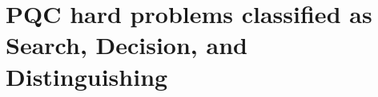 \documentclass[11pt]{article}
\begin{document}
\begin{center}
\begin{tabular}{|p{2.1cm}|p{3.2cm}|p{1.8cm}|p{3.8cm}|p{5.0cm}|}
%			
%			
%			
%			
		\end{tabular}
	\end{center}
	\normalsize
	
	\newpage
	\section{PQC hard problems classified as Search, Decision, and Distinguishing}
	
\end{document}
